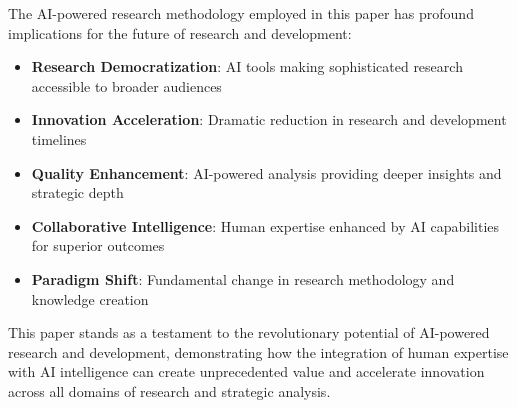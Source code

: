 \documentclass[12pt,a4paper]{book}
\begin{document}
The AI-powered research methodology employed in this paper has profound implications for the future of research and development:

\begin{itemize}
    \item \textbf{Research Democratization}: AI tools making sophisticated research accessible to broader audiences
    \item \textbf{Innovation Acceleration}: Dramatic reduction in research and development timelines
    \item \textbf{Quality Enhancement}: AI-powered analysis providing deeper insights and strategic depth
    \item \textbf{Collaborative Intelligence}: Human expertise enhanced by AI capabilities for superior outcomes
    \item \textbf{Paradigm Shift}: Fundamental change in research methodology and knowledge creation
\end{itemize}

This paper stands as a testament to the revolutionary potential of AI-powered research and development, demonstrating how the integration of human expertise with AI intelligence can create unprecedented value and accelerate innovation across all domains of research and strategic analysis.
\end{document}
